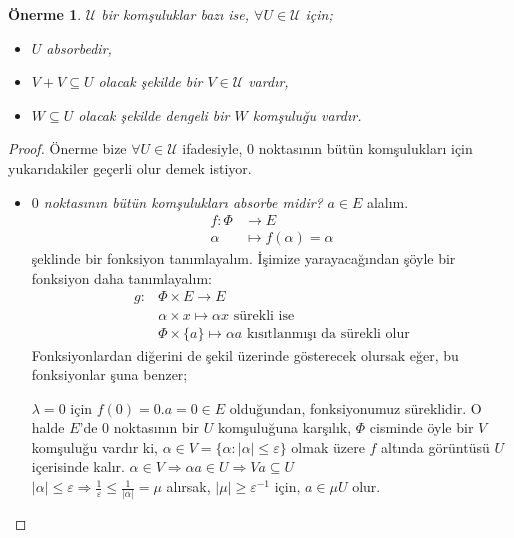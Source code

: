 \documentclass[11pt]{article}
\theoremstyle{plain}
\newtheorem{proposition}{Önerme}
\theoremstyle{definition}
\theoremstyle{remark}
\numberwithin{equation}{section}
\renewcommand{\%}{{\small \%}}
\begin{document}
\begin{proposition}
$\mathscr{U}$ bir komşuluklar bazı ise, $\forall U\in\mathscr{U}$ için;
\begin{itemize}
\item[(i)]$U$ absorbedir,
\item[(ii)]$V+V\subseteq U$ olacak şekilde bir $V\in\mathscr{U}$ vardır,
\item[(iii)]$W\subseteq U$ olacak şekilde  dengeli  bir $W$ komşuluğu vardır.
\end{itemize}
\end{proposition}

\begin{proof} Önerme bize $\forall U\in\mathscr{U}$ ifadesiyle, $0$ noktasının bütün komşulukları için yukarıdakiler geçerli olur demek istiyor.
\begin{itemize}  
\item[(i)] \emph{$0$ noktasının bütün komşulukları absorbe midir?}
$a\in E$ alalım.
\begin{align*}
f:\Phi &\longrightarrow E\\
\alpha&\longmapsto f(\alpha )=\alpha 
\end{align*}
şeklinde bir fonksiyon tanımlayalım. İşimize yarayacağından şöyle bir fonksiyon daha tanımlayalım:
\begin{align*}
g:&\Phi\times E \longrightarrow E\\
&\alpha\times x \longmapsto \alpha x \text{ sürekli ise}\\
&\Phi\times \{a\}\longmapsto \alpha a \text{ kısıtlanmışı da sürekli olur}
\end{align*}
Fonksiyonlardan diğerini de şekil üzerinde gösterecek olursak eğer, bu fonksiyonlar şuna benzer;\\
\newline
$\lambda =0$ için $f(0)=0.a=0\in E$ olduğundan, fonksiyonumuz süreklidir. O halde $E$'de $0$ noktasının bir $U$ komşuluğuna karşılık, $\Phi$ cisminde öyle bir $V$ komşuluğu vardır ki, $\alpha\in V=\{\alpha:|\alpha|\leq\varepsilon\}$ olmak üzere $f$ altında görüntüsü $U$ içerisinde kalır. $\alpha\in V\Longrightarrow \alpha a\in U \Longrightarrow Va\subseteq U$\\
$|\alpha|\leq\varepsilon\Rightarrow\frac{1}{\varepsilon}\leq\frac{1}{|\alpha|}=\mu$ alırsak, $|\mu|\geq\varepsilon^{-1}$ için, $a\in\mu U$ olur.\newpage


\end{itemize}
\end{proof}
\end{document}
